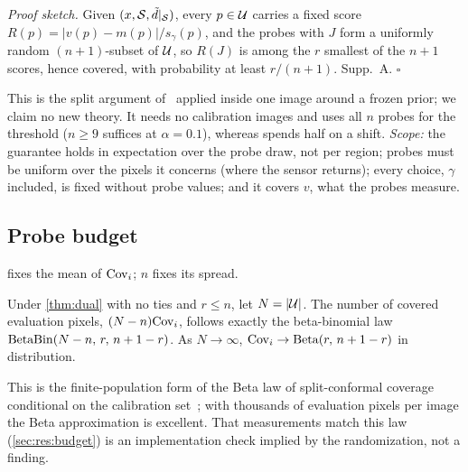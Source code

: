 \noindent\emph{Proof sketch.}
Given $(x,\mathcal{S},\tilde{d}|_{\mathcal{S}})$, every $p\in\mathcal{U}$ carries a fixed score $R(p)=|v(p)-m(p)|/s_\gamma(p)$, and the probes with $J$ form a uniformly random $(n+1)$-subset of $\mathcal{U}$, so $R(J)$ is among the $r$ smallest of the $n+1$ scores, hence covered, with probability at least $r/(n+1)$. Supp.~A. \hfill$\square$

This is the split argument of~\cite{gui2023cmc,mao2024spatial} applied inside one image around a frozen prior; we claim no new theory.
It needs no calibration images and uses all $n$ probes for the threshold ($n\ge 9$ suffices at $\alpha=0.1$), whereas \mLocalSplit spends half on a shift.
\emph{Scope:} the guarantee holds in expectation over the probe draw, not per region; probes must be uniform over the pixels it concerns (\eg where the sensor returns); every choice, $\gamma$ included, is fixed without probe values; and it covers $v$, what the probes measure.

\subsection{Probe budget}
\label{sec:budget}
 fixes the mean of $\mathrm{Cov}_i$; $n$ fixes its spread.

\begin{proposition}
\label{prop:budget}
Under \cref{thm:dual} with no ties and $r\le n$, let $N=|\mathcal{U}|$.
The number of covered evaluation pixels, $(N-n)\mathrm{Cov}_i$, follows exactly the beta-binomial law $\operatorname{BetaBin}(N-n,\,r,\,n+1-r)$.
As $N\to\infty$, $\mathrm{Cov}_i\to\operatorname{Beta}(r,\,n+1-r)$ in distribution.
\end{proposition}

\noindent This is the finite-population form of the Beta law of split-conformal coverage conditional on the calibration set~\cite{vovk2012conditional}; with thousands of evaluation pixels per image the Beta approximation is excellent.
That measurements match this law (\cref{sec:res:budget}) is an implementation check implied by the randomization, not a finding.

\noindent{}

